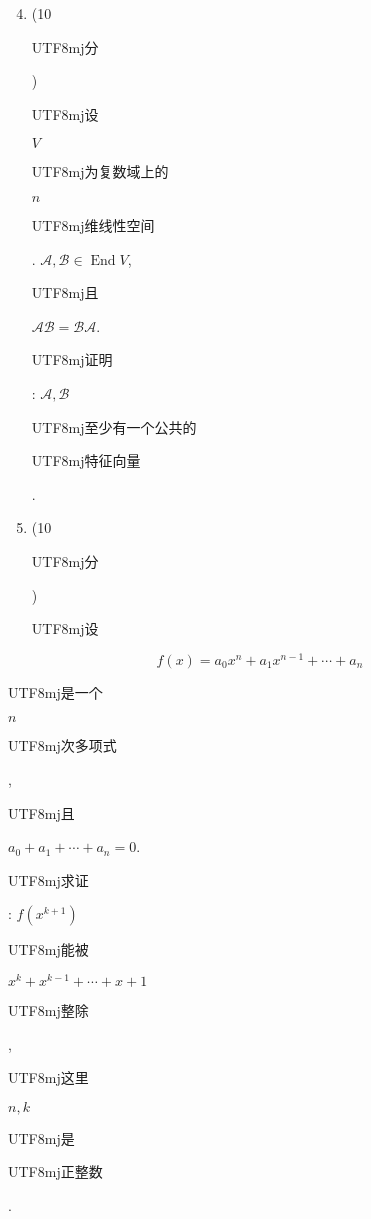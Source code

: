 \documentclass[10pt]{article}
\begin{document}
\begin{enumerate}
  \setcounter{enumi}{3}
  \item (10 \begin{CJK}{UTF8}{mj}分\end{CJK}) \begin{CJK}{UTF8}{mj}设\end{CJK} $V$ \begin{CJK}{UTF8}{mj}为复数域上的\end{CJK} $n$ \begin{CJK}{UTF8}{mj}维线性空间\end{CJK}. $\mathscr{A}, \mathscr{B} \in \operatorname{End} V$, \begin{CJK}{UTF8}{mj}且\end{CJK} $\mathscr{A} \mathscr{B}=\mathscr{B} \mathscr{A}$. \begin{CJK}{UTF8}{mj}证明\end{CJK}: $\mathscr{A}, \mathscr{B}$ \begin{CJK}{UTF8}{mj}至少有一个公共的\end{CJK} \begin{CJK}{UTF8}{mj}特征向量\end{CJK}.

  \item (10 \begin{CJK}{UTF8}{mj}分\end{CJK}) \begin{CJK}{UTF8}{mj}设\end{CJK}

\end{enumerate}
$$
f(x)=a_{0} x^{n}+a_{1} x^{n-1}+\cdots+a_{n}
$$
\begin{CJK}{UTF8}{mj}是一个\end{CJK} $n$ \begin{CJK}{UTF8}{mj}次多项式\end{CJK}, \begin{CJK}{UTF8}{mj}且\end{CJK} $a_{0}+a_{1}+\cdots+a_{n}=0$. \begin{CJK}{UTF8}{mj}求证\end{CJK}: $f\left(x^{k+1}\right)$ \begin{CJK}{UTF8}{mj}能被\end{CJK} $x^{k}+x^{k-1}+\cdots+x+1$ \begin{CJK}{UTF8}{mj}整除\end{CJK}, \begin{CJK}{UTF8}{mj}这里\end{CJK} $n, k$ \begin{CJK}{UTF8}{mj}是\end{CJK} \begin{CJK}{UTF8}{mj}正整数\end{CJK}.
\end{document}
